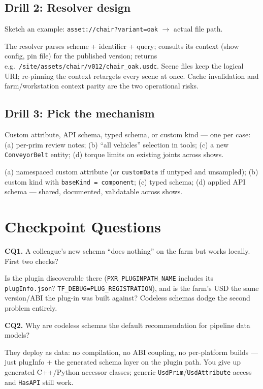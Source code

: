 \subsection*{Drill 2: Resolver design}
Sketch an example: \texttt{asset://chair?variant=oak} $\rightarrow$ actual
file path.
\begin{DrillSolution}
The resolver parses scheme + identifier + query; consults its context (show
config, pin file) for the published version; returns e.g.\
\texttt{/site/assets/chair/v012/chair\_oak.usdc}. Scene files keep the
logical URI; re-pinning the context retargets every scene at once. Cache
invalidation and farm/workstation context parity are the two operational
risks.
\end{DrillSolution}

\subsection*{Drill 3: Pick the mechanism}
Custom attribute, API schema, typed schema, or custom kind --- one per case:
(a) per-prim review notes; (b) ``all vehicles'' selection in tools; (c) a
new \texttt{ConveyorBelt} entity; (d) torque limits on existing joints
across shows.
\begin{DrillSolution}
(a) namespaced custom attribute (or \texttt{customData} if untyped and
unsampled); (b) custom kind with \texttt{baseKind = component}; (c) typed
schema; (d) applied API schema --- shared, documented, validatable across
shows.
\end{DrillSolution}

\section*{Checkpoint Questions}

\noindent\textbf{CQ1.} A colleague's new schema ``does nothing'' on the farm
but works locally. First two checks?
\begin{DrillSolution}
Is the plugin discoverable there (\texttt{PXR\_PLUGINPATH\_NAME} includes
its \texttt{plugInfo.json}? \texttt{TF\_DEBUG=PLUG\_REGISTRATION}), and is
the farm's USD the same version/ABI the plug-in was built against? Codeless
schemas dodge the second problem entirely.
\end{DrillSolution}

\noindent\textbf{CQ2.} Why are codeless schemas the default recommendation
for pipeline data models?
\begin{DrillSolution}
They deploy as data: no compilation, no ABI coupling, no per-platform
builds --- just plugInfo + the generated schema layer on the plugin path.
You give up generated C++/Python accessor classes; generic
\texttt{UsdPrim}/\texttt{UsdAttribute} access and \texttt{HasAPI} still
work.
\end{DrillSolution}

